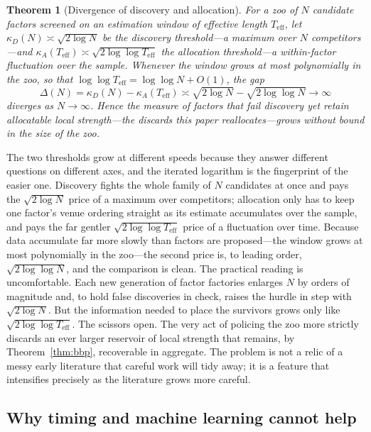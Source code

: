 \documentclass[12pt]{article}
\theoremstyle{plain}
\newtheorem{theorem}{Theorem}
\theoremstyle{definition}
\begin{document}
\begin{theorem}[Divergence of discovery and allocation]
\label{thm:diverge}
For a zoo of $N$ candidate factors screened on an estimation window of effective
length $T_{\text{eff}}$, let $\kappa_D(N)\asymp\sqrt{2\log N}$ be the discovery
threshold---a maximum over $N$ competitors---and $\kappa_A(T_{\text{eff}})\asymp
\sqrt{2\log\log T_{\text{eff}}}$ the allocation threshold---a within-factor
fluctuation over the sample. Whenever the window grows at most polynomially in
the zoo, so that $\log\log T_{\text{eff}}=\log\log N+O(1)$, the gap
\begin{equation}
\Delta(N)=\kappa_D(N)-\kappa_A(T_{\text{eff}})\asymp\sqrt{2\log N}-\sqrt{2\log\log N}
\to\infty
\label{eq:gap}
\end{equation}
diverges as $N\to\infty$. Hence the measure of factors that fail discovery yet
retain allocatable local strength---the discards this paper reallocates---grows
without bound in the size of the zoo.
\end{theorem}

\noindent The two thresholds grow at different speeds because they answer
different questions on different axes, and the iterated logarithm is the
fingerprint of the easier one. Discovery fights the whole family of $N$
candidates at once and pays the $\sqrt{2\log N}$ price of a maximum over
competitors; allocation only has to keep one factor's venue ordering straight as
its estimate accumulates over the sample, and pays the far gentler
$\sqrt{2\log\log T_{\text{eff}}}$ price of a fluctuation over time. Because data
accumulate far more slowly than factors are proposed---the window grows at most
polynomially in the zoo---the second price is, to leading order,
$\sqrt{2\log\log N}$, and the comparison is clean. The practical reading is
uncomfortable. Each new generation of factor factories enlarges $N$ by orders of
magnitude and, to hold false discoveries in check, raises the hurdle in step with
$\sqrt{2\log N}$. But the information needed to place the survivors grows only
like $\sqrt{2\log\log T_{\text{eff}}}$. The scissors open. The very act of
policing the zoo more strictly discards an ever larger reservoir of local
strength that remains, by Theorem~\ref{thm:bbp}, recoverable in aggregate. The
problem is not a relic of a messy early literature that careful work will tidy
away; it is a feature that intensifies precisely as the literature grows more
careful.

\subsection{Why timing and machine learning cannot help}
\end{document}
